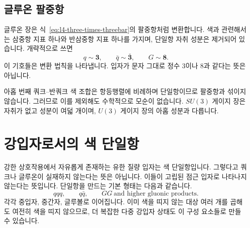 \subsection{글루온 팔중항}

글루온 장은 식~\eqref{eq:l4-three-times-threebar}의 팔중항처럼 변환합니다. 색과 관련해서는 삼중항 지표 하나와 반삼중항 지표 하나를 가지며, 단일항 자취 성분은 제거되어 있습니다. 개략적으로 쓰면
\begin{equation}
q\sim\boldsymbol 3,
\qquad
\bar q\sim\bar{\boldsymbol 3},
\qquad
G\sim\boldsymbol 8.
\end{equation}
이 기호들은 변환 법칙을 나타냅니다. 입자가 문자 그대로 정수 3이나 8과 같다는 뜻은 아닙니다.

아홉 번째 쿼크--반쿼크 색 조합은 항등행렬에 비례하며 단일항이므로 팔중항과 섞이지 않습니다. 그러므로 이를 제외해도 수학적으로 모순이 없습니다. \(SU(3)\) 게이지 장은 자취가 없고 성분이 여덟 개이며, \(U(3)\) 게이지 장의 아홉 성분과 다릅니다.

\begin{classroomqa}
\end{classroomqa}

\section{강입자로서의 색 단일항}

강한 상호작용에서 자유롭게 존재하는 유한 질량 입자는 색 단일항입니다. 그렇다고 쿼크나 글루온이 실재하지 않는다는 뜻은 아닙니다. 이들이 고립된 점근 입자로 나타나지 않는다는 뜻입니다. 단일항을 만드는 기본 형태는 다음과 같습니다.
\begin{equation}
qqq,
\qquad
q\bar q,
\qquad
GG\ \text{and higher gluonic products}.
\end{equation}
각각 중입자, 중간자, 글루볼로 이어집니다. 이미 색을 띠지 않는 대상 여러 개를 곱해도 여전히 색을 띠지 않으므로, 더 복잡한 다중 강입자 상태도 이 구성 요소들로 만들 수 있습니다.

\begin{classroomqa}
\end{classroomqa}

